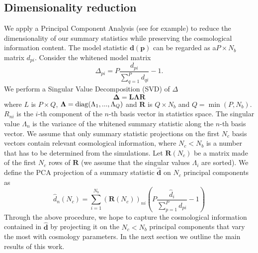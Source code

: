 \documentclass[reprint,aps,prd,superscriptaddress,showkeys,showpacs]{revtex4-1}
\newcommand{\bb}[1]{\mathbf{#1}}
\newcommand{\bbh}[1]{\mathbf{\hat{#1}}}
\newcommand{\h}[1]{\hat{#1}}
\begin{document}

\subsection{Dimensionality reduction}
We apply a Principal Component Analysis (see \citep{astroMLText} for example) to reduce the dimensionality of our summary statistics while preserving the cosmological information content. The model statistic $\bb{d}(\bb{p})$ can be regarded as a$P\times N_b$ matrix $d_{pi}$. Consider the whitened model matrix
\begin{equation}
\label{meth:whitening}
\Delta_{pi} = P\frac{d_{pi}}{\sum_{q=1}^Pd_{qi}} - 1.
\end{equation} 
%
We perform a Singular Value Decomposition (SVD) of $\Delta$ 
\begin{equation}
\bb\Delta = \bb{L}\bb{\Lambda} \bb{R}
\end{equation}
%
where $L$ is $P\times Q$, $\bb{\Lambda}={\rm diag}(\Lambda_1,...,\Lambda_Q)$ and $\bb{R}$ is $Q\times N_b$ and $Q={\min}(P,N_b)$. $R_{ni}$ is the $i$-th component of the $n$-th basis vector in statistics space. The singular value $\Lambda_n$ is the variance of the whitened summary statistic along the $n$-th basis vector. We assume that only summary statistic projections on the first $N_c$ basis vectors contain relevant cosmological information, where $N_c<N_b$ is a number that has to be determined from the simulations. Let $\bb{R}(N_c)$ be a matrix made of the first $N_c$ rows of $\bb{R}$ (we assume that the singular values $\Lambda_i$ are sorted). We define the PCA projection of a summary statistic $\bbh{d}$ on $N_c$ principal components as 
\begin{equation}
\label{meth:pcaprojection}
\h{d}_n(N_c) = \sum_{i=1}^{N_b}(\bb{R}(N_c))_{ni}\left(P\frac{\h{d}_i}{\sum_{p=1}^P d_{pi}}-1\right) 
\end{equation} 
%
Through the above procedure, we hope to capture the cosmological information contained in $\bbh{d}$ by projecting it on the $N_c<N_b$ principal components that vary the most with cosmology parameters. In the next section we outline the main results of this work.  

\end{document}
